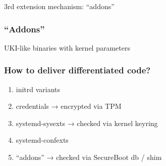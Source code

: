 \documentclass[]{beamer}
\newcommand\pp\pause
\begin{document}










\begin{frame}
  3rd extension mechanism: ``addons''
\end{frame}

\begin{frame}
  \frametitle{``Addons''}

  UKI-like binaries with kernel parameters
\end{frame}

\begin{frame}
  \frametitle{How to deliver differentiated code?}
  \pp

  \begin{enumerate}
    \addtocounter{enumi}{-1}
  \item initrd variants\pp
  \item credentials → encrypted via TPM\pp
  \item systemd-sysexts → checked via kernel keyring
  \item systemd-confexts\pp
  \item ``addons'' → checked via SecureBoot db / shim
  \end{enumerate}
\end{frame}
\end{document}

